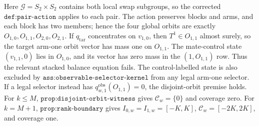 Here \(\mathcal G=S_2\times S_2\) contains both local swap subgroups, so the corrected \(\texttt{def:pair-action}\) applies to each pair. The action preserves blocks and arms, and each block has two members; hence the four global orbits are exactly \(O_{1,0},O_{1,1},O_{2,0},O_{2,1}\). If \(q_{\mathrm{tar}}\) concentrates on \(v_{1,0}\), then \(T^1\in O_{1,1}\) almost surely, so the target arm-one orbit vector has mass one on \(O_{1,1}\). The mate-control state \((v_{1,1},0)\) lies in \(O_{1,0}\), and its vector has zero mass in the \((1,O_{1,1})\) row. Thus the relevant stacked balance equation fails. The control-labelled state is also excluded by \(\texttt{ass:observable-selector-kernel}\) from any legal arm-one selector. If a legal selector instead has \(q^{\mathrm{obs}}_{w,1}(O_{1,1})=0\), the disjoint-orbit premise holds. For \(k\le M\), \(\texttt{prop:disjoint-orbit-witness}\) gives \(\mathcal C_w=\{0\}\) and coverage zero. For \(k=M+1\), \(\texttt{prop:rank-boundary}\) gives \(I_{0,w}=I_{1,w}=[-K,K]\), \(\mathcal C_w=[-2K,2K]\), and coverage one.